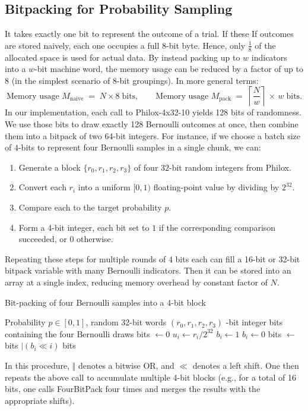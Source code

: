 \subsection{Bitpacking for Probability Sampling}
It takes exactly one bit to represent the outcome of a trial. If these If outcomes are stored naively, each one occupies a full 8-bit byte. Hence, only \( \tfrac{1}{8} \) of the allocated space is used for actual data. By instead packing up to \(w\) indicators into a \(w\)-bit machine word, the memory usage can be reduced by a factor of up to \(8\) (in the simplest scenario of 8-bit groupings). In more general terms:
\[
  \text{Memory usage }M_{\text{naive}}
  \;=\;
  N \times 8\;\text{bits},
  \qquad
  \text{Memory usage }M_{\text{pack}}
  \;=\;
  \left\lceil\frac{N}{w}\right\rceil \,\times\,w\;\text{bits}.
\]
In our implementation, each call to Philox-4x32-10 yields 128 bits of randomness. We use those bits to draw exactly 128 Bernoulli outcomes at once, then combine them into a \(\mathrm{bitpack}\) of two 64-bit integers. For instance, if we choose a batch size of \(4\)-bits to represent four Bernoulli samples in a single chunk, we can:

\begin{enumerate}
    \item Generate a block \(\{r_0, r_1, r_2, r_3\}\) of four 32-bit random integers from Philox.
    \item Convert each \(r_i\) into a uniform \([0,1)\) floating-point value by dividing by \(2^{32}\).
    \item Compare each to the target probability \(p\).
    \item Form a 4-bit integer, each bit set to \(1\) if the corresponding comparison succeeded, or \(0\) otherwise.
\end{enumerate}

Repeating these steps for multiple rounds of 4 bits each can fill a 16-bit or 32-bit \(\mathrm{bitpack}\) variable with many Bernoulli indicators. Then it can be stored into an array at a single index, reducing memory overhead by constant factor of $N$. 

\begin{algorithm}[H]
  \caption{Bit-packing of four Bernoulli samples into a 4-bit block}
  \label{alg:four_bit_pack}
  \begin{algorithmic}[1]
    \Require Probability $p\in[0,1]$, random 32-bit words $(r_0,r_1,r_2,r_3)$
    -bit integer bits containing the four Bernoulli draws
      \State bits $\gets 0$
        \State $u_i \gets r_i / 2^{32}$ \Comment{$u_i\in[0,1)$}
            \State $b_i \gets 1$
        \Else
            \State $b_i \gets 0$
        \EndIf
        \State bits $\gets$ bits $\mid (b_i \ll i)$ 
      \EndFor
      \State \Return bits
    \EndProcedure
  \end{algorithmic}
\end{algorithm}

In this procedure, \(\Vert\) denotes a bitwise OR, and \(\ll\) denotes a left shift. One then repeats the above call to accumulate multiple 4-bit blocks (e.g., for a total of 16 bits, one calls FourBitPack four times and merges the results with the appropriate shifts).